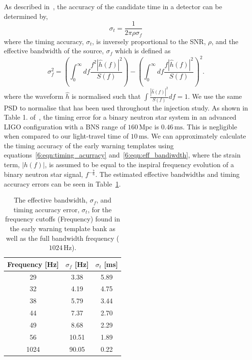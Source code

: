 As described in~\cite{Fairhurst:2010}, the accuracy of the candidate time in a detector can be determined by,
%
\begin{equation}
    \sigma_{t} = \frac{1}{2\pi\rho\sigma_{f}}
    \label{6:eqn:timing_acurracy}
\end{equation}
%
where the timing accuracy, $\sigma_{t}$, is inversely proportional to the SNR, $\rho$, and the effective bandwidth of the source, $\sigma_{f}$ which is defined as
%
\begin{equation}
    \sigma_{f}^2 = \left(\int^{\infty}_{0} df \frac{f^{2}|\hat{h}(f)|^{2}}{S(f)}\right) - \left( \int^{\infty}_{0} df \frac{f|\hat{h}(f)|^{2}}{S(f)}\right)^{2} .
    \label{6:eqn:eff_bandiwdth}
\end{equation}
%
where the waveform $\hat{h}$ is normalised such that $\int \frac{|\hat{h}(f)|^{2}}{S(f)}df = 1$. We use the same PSD to normalise that has been used throughout the injection study. As shown in Table 1. of~\cite{Fairhurst:2010}, the timing error for a binary neutron star system in an advanced LIGO configuration with a BNS range of $160 \, \text{Mpc}$ is $0.46 \, \text{ms}$. This is negligible when compared to our light-travel time of $10 \, \text{ms}$. We can approximately calculate the timing accuracy of the early warning templates using equations~\ref{6:eqn:timing_acurracy} and~\ref{6:eqn:eff_bandiwdth}, where the \gwadj strain term, $|h(f)|$, is assumed to be equal to the inspiral frequency evolution of a binary neutron star signal, $f^{-\frac{7}{6}}$. The estimated effective bandwidths and timing accuracy errors can be seen in Table~\ref{6:tab:timing_errors}.
%
\begin{table}[ht]
    \centering
    \setlength{\tabcolsep}{4pt}
    \begin{tabular}{ccc}
        \toprule
        \textbf{Frequency [Hz]} & $\sigma_{f}$ [Hz] & $\sigma_{t}$ [ms] \\
        \midrule
        29 & 3.38 & 5.89 \\
        32 & 4.19 & 4.75 \\
        38 & 5.79 & 3.44 \\
        44 & 7.37 & 2.70 \\
        49 & 8.68 & 2.29 \\
        56 & 10.51 & 1.89 \\
        1024 & 90.05 & 0.22 \\
        \bottomrule
    \end{tabular}
    \caption{The effective bandwidth, $\sigma_{f}$, and timing accuracy error, $\sigma_{t}$, for the frequency cutoffs (Frequency) found in the early warning template bank as well as the full bandwidth frequency ($1024 \, \text{Hz}$).}
    \label{6:tab:timing_errors}
\end{table}
